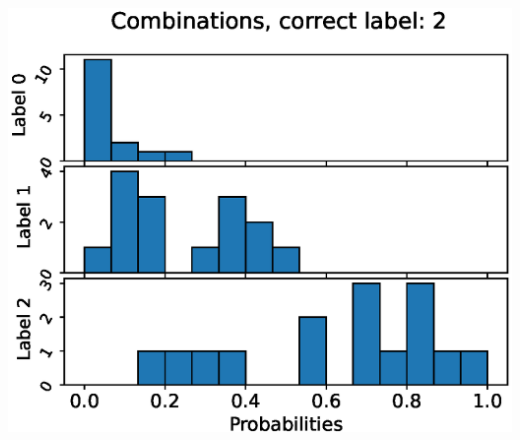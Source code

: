 \begin{center}
\begin{minipage}{0.33\textwidth}
  \includegraphics[width=\textwidth]{files/figs/app/hists/femval/c2.eps}
\end{minipage}


\end{center}
